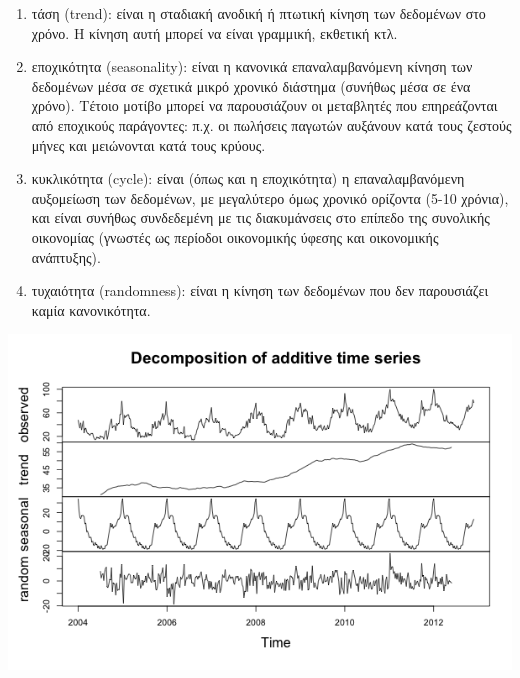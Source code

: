 \begin{enumerate}
\item τάση (trend): είναι η σταδιακή ανοδική ή πτωτική κίνηση των δεδομένων στο
χρόνο. Η κίνηση αυτή μπορεί να είναι γραμμική, εκθετική κτλ.\\
\item εποχικότητα (seasonality): είναι η κανονικά επαναλαμβανόμενη κίνηση των
δεδομένων μέσα σε σχετικά μικρό χρονικό διάστημα (συνήθως μέσα σε ένα
χρόνο). Τέτοιο μοτίβο μπορεί να παρουσιάζουν οι μεταβλητές που
επηρεάζονται από εποχικούς παράγοντες: π.χ. οι πωλήσεις παγωτών αυξάνουν
κατά τους ζεστούς μήνες και μειώνονται κατά τους κρύους.
\item κυκλικότητα (cycle): είναι (όπως και η εποχικότητα) η επαναλαμβανόμενη
αυξομείωση των δεδομένων, με μεγαλύτερο όμως χρονικό ορίζοντα (5-10
χρόνια), και είναι συνήθως συνδεδεμένη με τις διακυμάνσεις στο επίπεδο της
συνολικής οικονομίας (γνωστές ως περίοδοι οικονομικής ύφεσης και
οικονομικής ανάπτυξης).\\
\item τυχαιότητα (randomness): είναι η κίνηση των δεδομένων που δεν παρουσιάζει
καμία κανονικότητα.
\end{enumerate}

\begin{center}
\includegraphics[scale=0.6]{pic2.png}
\end{center}
